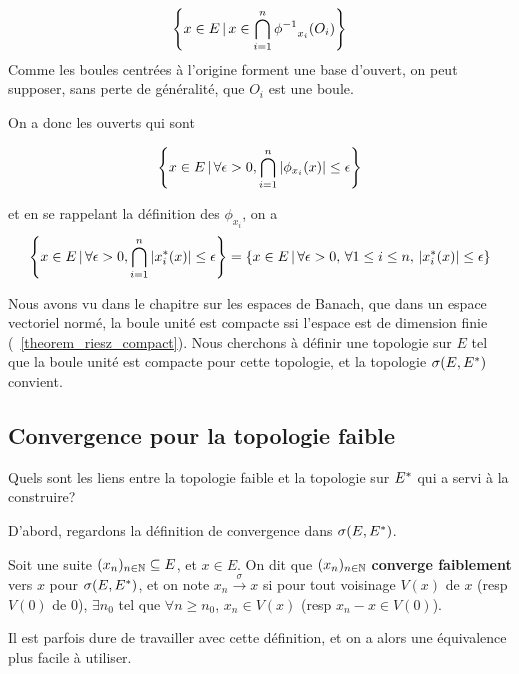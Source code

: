 \begin{equation}
	\left\{x \in E \, | \, x \in \bigcap_{i = 1}^{n} {\phi^{-1}}_{{x_{i}}}(O_{i}) \right\}
\end{equation}
Comme les boules centrées à l'origine forment une base d'ouvert, on peut
supposer, sans perte de généralité, que $O_{i}$ est une boule.

On a donc les ouverts qui sont

\begin{equation}
	\left\{x \in E \, | \, \forall \epsilon > 0, \bigcap_{i = 1}^{n}
	\abs{\phi_{x_{i}}(x)} \leq \epsilon \right\}
\end{equation}

et en se rappelant la définition des $\phi_{x_{i}}$, on a
\begin{equation}
	\left\{x \in E \, | \, \forall \epsilon > 0, \bigcap_{i = 1}^{n}
	\abs{x_{i}^{*}(x)} \leq \epsilon \right\} = \left\{x \in E \, | \, \forall \epsilon > 0,
		\, \forall 1 \leq i \leq n, \, \abs{x_{i}^{*}(x)} \leq \epsilon \right\}
\end{equation}

Nous avons vu dans le chapitre sur les espaces de Banach, que dans un espace
vectoriel normé, la boule unité est compacte ssi l'espace est de dimension
finie (~\ref{theorem_riesz_compact}). Nous cherchons à définir une topologie sur
$E$ tel que la boule unité est compacte pour cette topologie, et la topologie
$\sigma(E, E^{*})$ convient.

\subsection{Convergence pour la topologie faible}
Quels sont les liens entre la topologie faible et la topologie sur $E^{*}$
qui a servi à la construire?

D'abord, regardons la définition de convergence dans $\sigma(E, E^{*})$.
\begin{definition}
	Soit une suite $(x_{n})_{n \in \mathbb{N}} \subseteq E$, et $x \in E$.
	On dit que $(x_{n})_{n \in \mathbb{N}}$ \textbf{converge faiblement} vers $x$
	pour $\sigma(E, E^{*})$, et on note $x_{n} \xrightarrow{\sigma} x$ si pour tout
	voisinage $V(x)$ de $x$ (resp $V(0)$ de $0$), $\exists n_{0}$ tel que
	$\forall n \geq n_{0}$, $x_{n} \in V(x)$ (resp $x_{n} - x \in V(0)$).
\end{definition}

Il est parfois dure de travailler avec cette définition, et on a alors une
équivalence plus facile à utiliser.

